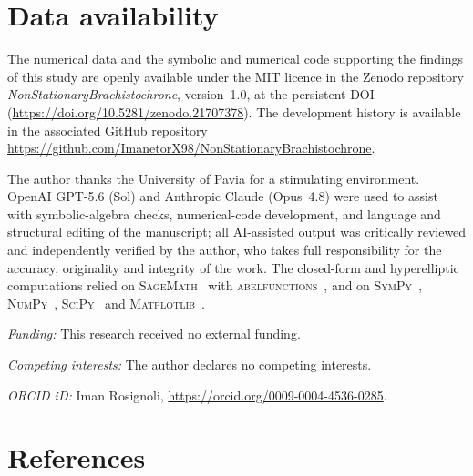 \documentclass[12pt]{iopart}
\begin{document}
\FloatBarrier


\section*{Data availability}
The numerical data and the symbolic and numerical code supporting the findings of this
study are openly available under the MIT licence in the Zenodo repository
\emph{NonStationaryBrachistochrone}, version~1.0, at the persistent
DOI~\cite{Rosignoli2026Code} (\url{https://doi.org/10.5281/zenodo.21707378}). The
development history is available in the associated GitHub repository
\url{https://github.com/ImanetorX98/NonStationaryBrachistochrone}.

\ack
The author thanks the University of Pavia for a stimulating environment. OpenAI
GPT-5.6 (Sol) and Anthropic Claude (Opus~4.8) were used to assist with symbolic-algebra
checks, numerical-code development, and language and structural editing of the manuscript;
all AI-assisted output was critically reviewed and independently verified by the author,
who takes full responsibility for the accuracy, originality and integrity of the work. The
closed-form and hyperelliptic computations relied on \textsc{SageMath}~\cite{SageMath}
with \textsc{abelfunctions}~\cite{abelfunctions}, and on
\textsc{SymPy}~\cite{SymPy}, \textsc{NumPy}~\cite{NumPy}, \textsc{SciPy}~\cite{SciPy} and
\textsc{Matplotlib}~\cite{Matplotlib}.

\medskip\noindent\textit{Funding:} This research received no external funding.

\medskip\noindent\textit{Competing interests:} The author declares no competing interests.

\medskip\noindent\textit{ORCID iD:} Iman Rosignoli,
\url{https://orcid.org/0009-0004-4536-0285}.

\section*{References}


\end{document}
